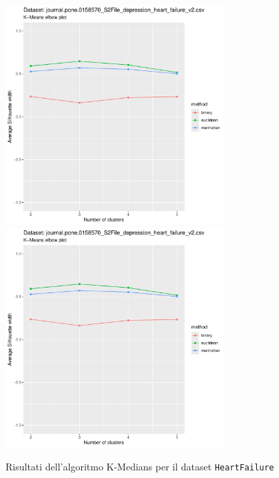 \documentclass[a4paper, 12pt]{report}
\begin{document}
			\begin{figure}[H]
				\centering
				\includegraphics[width = 0.75\textwidth, height = 0.45\textheight, page = 3]{
					results/results_HeartFailure.csv.pdf
				}
				\includegraphics[width = 0.75\textwidth, height = 0.45\textheight, page = 4]{
					results/results_HeartFailure.csv.pdf
				}
				\caption{Risultati dell'algoritmo K-Medians per il dataset
				\texttt{HeartFailure}}
				\label{fig:kmedians1}
			\end{figure}
\end{document}
